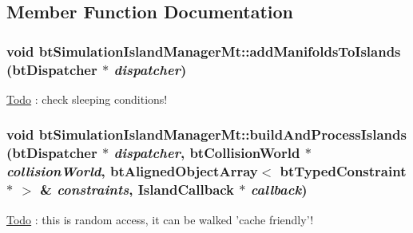 \subsection{Member Function Documentation}
\hypertarget{classbt_simulation_island_manager_mt_77eadf262f5a0e63053e3efcc9ccfec9}{
\subsubsection[addManifoldsToIslands]{\setlength{\rightskip}{0pt plus 5cm}void btSimulationIslandManagerMt::addManifoldsToIslands ({\bf btDispatcher} $\ast$ {\em dispatcher})}}
\label{classbt_simulation_island_manager_mt_77eadf262f5a0e63053e3efcc9ccfec9}




\begin{Desc}
\item[\hyperlink{todo__todo000035}{Todo}]: check sleeping conditions! \end{Desc}
\hypertarget{classbt_simulation_island_manager_mt_9be20c991c57ec972eb33a160d6276fd}{
\subsubsection[buildAndProcessIslands]{\setlength{\rightskip}{0pt plus 5cm}void btSimulationIslandManagerMt::buildAndProcessIslands ({\bf btDispatcher} $\ast$ {\em dispatcher}, \/  {\bf btCollisionWorld} $\ast$ {\em collisionWorld}, \/  {\bf btAlignedObjectArray}$<$ btTypedConstraint $\ast$ $>$ \& {\em constraints}, \/  IslandCallback $\ast$ {\em callback})}}
\label{classbt_simulation_island_manager_mt_9be20c991c57ec972eb33a160d6276fd}


\begin{Desc}
\item[\hyperlink{todo__todo000036}{Todo}]: this is random access, it can be walked 'cache friendly'! \end{Desc}



